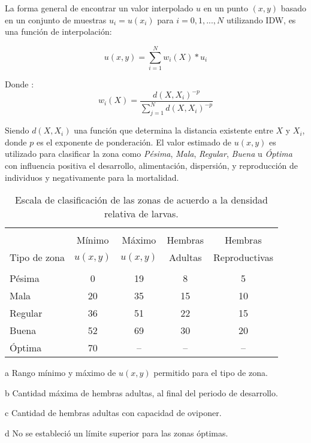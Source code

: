 La forma general de encontrar un valor interpolado $u$ en un punto $(x,y)$ basado en un conjunto de
muestras $u_i = u (x_i)$ para $i = 0,1, ..., N$ utilizando IDW, es una función de interpolación:

\begin{equation}\label{eq:interpolacion-idw}
 u(x,y) = \sum_{i=1}^{N} w_i(X) * u_{i}
\end{equation}

Donde :
\begin{equation}
w_i(X) =  \dfrac{d(X, X_i)^{-p}}{\sum_{j=1}^{N} d(X, X_i)^{-p}}
\end{equation}

Siendo $d(X, X_i)$ una función que determina la distancia existente entre $X$ y $X_{i}$, donde $p$
es el exponente de ponderación.  El valor estimado de $u(x,y)$ es utilizado para clasificar la
zona como \textit{Pésima}, \textit{Mala}, \textit{Regular}, \textit{Buena} u \textit{Óptima} con
influencia positiva el desarrollo, alimentación, dispersión, y reproducción de individuos y
negativamente para la mortalidad.

\begin{table}[!hptb]
\begin{threeparttable}
    \begin{minipage}[b]{0.5\textwidth}
    \caption{\label{tab:cap4-puntaje-zona} Escala de clasificación de las zonas de acuerdo a la densidad relativa de larvas.}
    \footnotesize
    \begin{tabular}{l c c c c}
        \hline \\
                     & Mínimo\tnote{a} & Máximo\tnote{a} & Hembras     & Hembras \\
        Tipo de zona & $u(x,y)$   & $u(x,y)$   & Adultas\tnote{b} & Reproductivas \tnote{c}\\
        \hline
        \hline\\
        Pésima  & 0  & 19 & 8  & 5 \\
        Mala    & 20 & 35 & 15 & 10\\
        Regular & 36 & 51 & 22 & 15\\
        Buena   & 52 & 69 & 30 & 20\\
        Óptima  & 70 & --\tnote{d} & --\tnote{d} & --\tnote{d}\\
        \hline
    \end{tabular}
    \begin{tablenotes}[flushleft]\footnotesize
    \item[a]{Rango mínimo y máximo de $u(x,y)$ permitido para el tipo de zona.}
    \item[b]{Cantidad máxima de hembras adultas, al final del periodo de desarrollo.}
    \item[c]{Cantidad de hembras adultas con capacidad de oviponer.}
    \item[d]{No se estableció un límite superior para las zonas óptimas. }
    \end{tablenotes}
    \end{minipage}
    \end{threeparttable}
\end{table}

